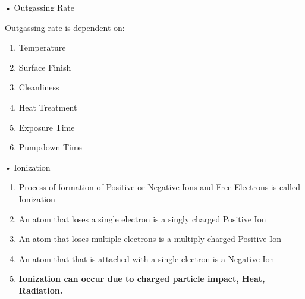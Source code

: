 \documentclass[11]{beamer}
\begin{document}
\begin{frame}{• Outgassing Rate}


\begin{exampleblock}{}
Outgassing rate is dependent on:
\begin{enumerate}
		\item Temperature
		\item Surface Finish
		\item Cleanliness
		\item Heat Treatment
		\item Exposure Time
		\item Pumpdown Time

		
\end{enumerate}

\end{exampleblock}		


\end{frame}



\begin{frame}{• Ionization}

\begin{exampleblock}


\begin{enumerate}
		\item Process of formation of Positive or Negative Ions and Free Electrons is called Ionization
\item An atom that loses a single electron is a singly charged Positive Ion
\item An atom that loses multiple electrons is a multiply charged Positive Ion
\item An atom that that is attached with a single electron is a Negative Ion
\item \textbf{Ionization can occur due to charged particle impact, Heat, Radiation.}

		
\end{enumerate}

\end{exampleblock}		


\end{frame}
\end{document}
